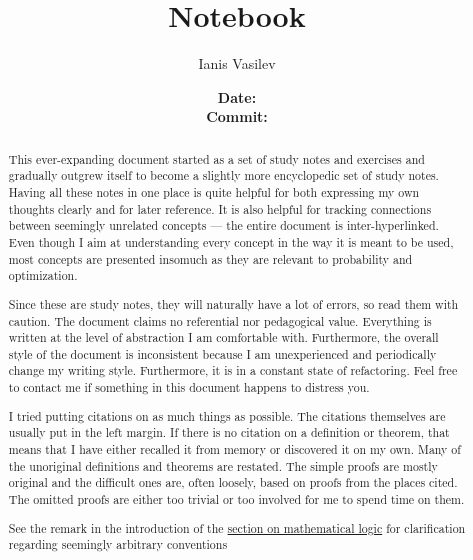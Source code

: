 \documentclass{notebook}
\title{Notebook}
\subtitle{\boldtt{\url{https://github.com/v--/notebook}}}
\author{Ianis Vasilev}
\date
  {
    \normalsize
    \textbf{Date:} \GitCommitInfoDate \\
    \textbf{Commit:} \texttt{\GitCommitInfoHash}
  }
\begin{document}
\maketitle

\begin{abstract}
  This ever-expanding document started as a set of study notes and exercises and gradually outgrew itself to become a slightly more encyclopedic set of study notes. Having all these notes in one place is quite helpful for both expressing my own thoughts clearly and for later reference. It is also helpful for tracking connections between seemingly unrelated concepts --- the entire document is inter-hyperlinked. Even though I aim at understanding every concept in the way it is meant to be used, most concepts are presented insomuch as they are relevant to probability and optimization.

  Since these are study notes, they will naturally have a lot of errors, so read them with caution. The document claims no referential nor pedagogical value. Everything is written at the level of abstraction I am comfortable with. Furthermore, the overall style of the document is inconsistent because I am unexperienced and periodically change my writing style. Furthermore, it is in a constant state of refactoring. Feel free to contact me if something in this document happens to distress you.

  I tried putting citations on as much things as possible. The citations themselves are usually put in the left margin. If there is no citation on a definition or theorem, that means that I have either recalled it from memory or discovered it on my own. Many of the unoriginal definitions and theorems are restated. The simple proofs are mostly original and the difficult ones are, often loosely, based on proofs from the places cited. The omitted proofs are either too trivial or too involved for me to spend time on them.

  See the remark in the introduction of the \hyperref[sec:mathematical_logic]{section on mathematical logic} for clarification regarding seemingly arbitrary conventions
\end{abstract}

\newpage
{}
\tableofcontents
\newpage















\end{document}
